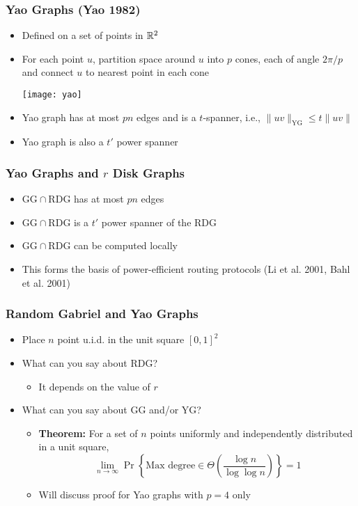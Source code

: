 \documentclass{beamer}
\newcommand{\GG}{\mathrm{GG}}
\newcommand{\YG}{\mathrm{YG}}
\newcommand{\RDG}{\mathrm{RDG}}
\begin{document}
\frame
{
  \frametitle{Yao Graphs (Yao 1982)}
  \begin{itemize}
    \item Defined on a set of points in $\mathbb{R}^2$
    \item For each point $u$, partition space around $u$ into $p$ cones,
           each of angle $2\pi/p$ and connect $u$ to nearest point in each cone
    \begin{center}
      \texttt{[image: yao]}
    \end{center}
    \item Yao graph has at most $pn$ edges and is a $t$-spanner, i.e., 
       $\|uv\|_{\YG} \le t\|uv\|$
    \item Yao graph is also a $t'$ power spanner
  \end{itemize}
}

\frame
{
  \frametitle{Yao Graphs and $r$ Disk Graphs}
  \begin{itemize}
    \item $\GG\cap\RDG$ has at most $pn$ edges
    \item $\GG\cap\RDG$ is a $t'$ power spanner of the $\RDG$
    \item $\GG\cap\RDG$ can be computed locally
    \item This forms the basis of power-efficient routing protocols
          (Li et al. 2001, Bahl et al. 2001)
  \end{itemize}
}

\frame
{
  \frametitle{Random Gabriel and Yao Graphs}
  \begin{itemize}
    \item Place $n$ point u.i.d. in the unit square $[0,1]^2$
    \item What can you say about $\RDG$?
      \begin{itemize}
        \item It depends on the value of $r$
       \end{itemize}
    \item What can you say about $\GG$ and/or $\YG$?
       \begin{itemize}
         \item \textbf{Theorem:}
           For a set of $n$ points uniformly and independently distributed
		in a unit square, 
           \[\lim_{n\rightarrow\infty}
              \Pr\left\{\mbox{Max degree} \in \Theta\left(\frac{\log
n}{\log\log n}\right)\right\} = 1 \]
         \item Will discuss proof for Yao graphs with $p=4$ only
       \end{itemize}
  \end{itemize}
}
\end{document}
